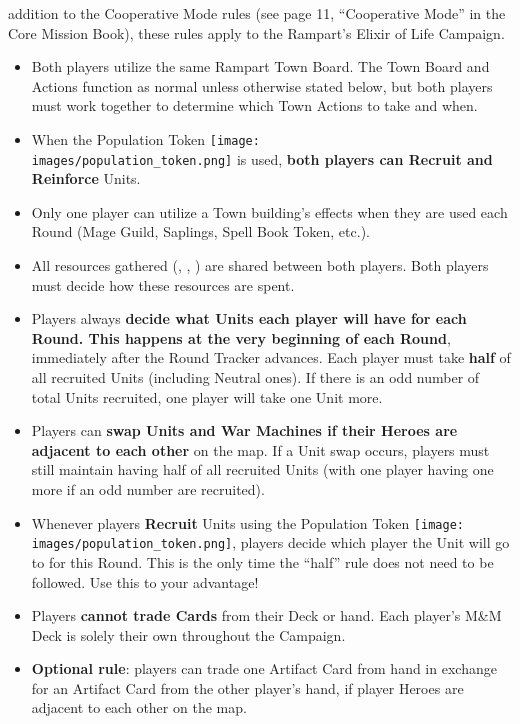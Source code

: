 
\begin{multicols*}{2}

 addition to the Cooperative Mode rules (see page 11, ``Cooperative Mode'' in the Core Mission Book), these rules apply to the Rampart's Elixir of Life Campaign.

\begin{itemize}
  \item Both players utilize the same Rampart Town Board.
    The Town Board and Actions function as normal unless otherwise stated below, but both players must work together to determine which Town Actions to take and when.
  \item When the Population Token {\texttt{[image: \\images/population\_token.png]}} is used, \textbf{both players can Recruit and Reinforce} Units.
  \item Only one player can utilize a Town building's effects when they are used each Round (Mage Guild, Saplings, Spell Book Token, etc.).
  \item All resources gathered (, , ) are shared between both players.
    Both players must decide how these resources are spent.
  \item Players always \textbf{decide what Units each player will have for each Round.
    This happens at the very beginning of each Round}, immediately after the Round Tracker advances.
    Each player must take \textbf{half} of all recruited Units (including Neutral ones).
    If there is an odd number of total Units recruited, one player will take one Unit more.
  \item Players can \textbf{swap Units and War Machines if their Heroes are adjacent to each other} on the map.
    If a Unit swap occurs, players must still maintain having half of all recruited Units (with one player having one more if an odd number are recruited).
  \columnbreak
  \item Whenever players \textbf{Recruit} Units using the Population Token {\texttt{[image: \\images/population\_token.png]}}, players decide which player the Unit will go to for this Round.
    This is the only time the ``half'' rule does not need to be followed.
    Use this to your advantage!
  \item Players \textbf{cannot trade Cards} from their Deck or hand.
    Each player's M\&M Deck is solely their own throughout the Campaign.
  \item \textbf{Optional rule}: players can trade one Artifact Card from hand in exchange for an Artifact Card from the other player's hand, if player Heroes are adjacent to each other on the map.
\end{itemize}

\vspace*{\fill}
\begin{center}
\end{center}

\end{multicols*}
